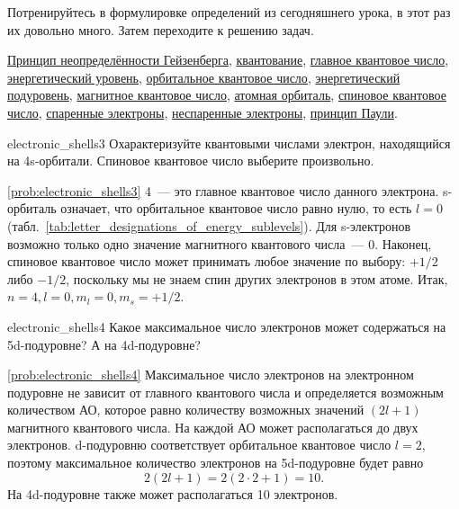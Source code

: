Потренируйтесь в формулировке определений из сегодняшнего урока, в этот раз их довольно много. Затем переходите к решению задач.

\begin{termlist}
    \hyperref[term:Heisenberg_uncertainty_principle]{Принцип неопределённости Гейзенберга},
    \hyperref[term:quantization]{квантование},
    \hyperref[term:main_quantum_number]{главное квантовое число},
    \hyperref[term:energy_level]{энергетический уровень},
    \hyperref[term:orbital_quantum_number]{орбитальное квантовое число}, \hyperref[term:energy_sublevel]{энергетический подуровень},
    \hyperref[term:magnetic_quantum_number]{магнитное квантовое число}, \hyperref[term:atomic_orbital]{атомная орбиталь},
    \hyperref[term:spin_quantum_number]{спиновое квантовое число},
    \hyperref[term:paired_electrons]{спаренные электроны},
    \hyperref[term:unpaired_electrons]{неспаренные электроны},
    \hyperref[term:Pauli_principle]{принцип Паули}.
\end{termlist}

\begin{problem}{}{electronic_shells3}
    Охарактеризуйте квантовыми числами электрон, находящийся на 4s-орбитали. Спиновое квантовое число выберите произвольно.
    \begin{sol}{\ref{prob:electronic_shells3}}
        4~--- это главное квантовое число данного электрона. s-орбиталь означает, что орбитальное квантовое число равно нулю, то есть $l = 0$ (табл.~\ref{tab:letter_designations_of_energy_sublevels}). Для s-электронов возможно только одно значение магнитного квантового числа~--- 0. Наконец, спиновое квантовое число может принимать любое значение по выбору: $+1/2$ либо $-1/2$, поскольку мы не знаем спин других электронов в этом атоме. Итак, $n = 4, l = 0, m_l = 0, m_s = +1/2$.
    \end{sol}
\end{problem}

\begin{problem}{}{electronic_shells4}
    Какое максимальное число электронов может содержаться на 5d-подуровне? А на 4d-подуровне?
    \begin{sol}{\ref{prob:electronic_shells4}}
        Максимальное число электронов на электронном подуровне не зависит от главного квантового числа и определяется возможным количеством АО, которое равно количеству возможных значений $(2l + 1)$ магнитного квантового числа. На каждой АО может располагаться до двух электронов. d-подуровню соответствует орбитальное квантовое число $l = 2$, поэтому максимальное количество электронов на 5d-подуровне будет равно
        \begin{equation*}
            2(2l + 1) = 2(2 \cdot 2 + 1) = 10.
        \end{equation*}
        На 4d-подуровне также может располагаться 10 электронов.
    \end{sol}
\end{problem}

